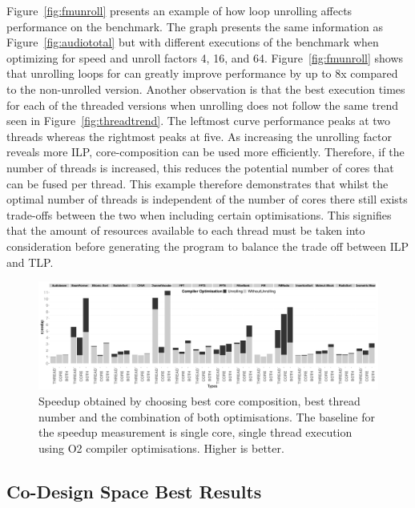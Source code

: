 Figure~\ref{fig:fmunroll} presents an example of how loop unrolling affects performance on the  benchmark.
The graph presents the same information as Figure~\ref{fig:audiototal} but with different executions of the benchmark when optimizing for speed and unroll factors 4, 16, and 64.
Figure~\ref{fig:fmunroll} shows that unrolling loops for  can greatly improve performance by up to 8x compared to the non-unrolled version.
Another observation is that the best execution times for each of the threaded versions when unrolling does not follow the same trend seen in Figure~\ref{fig:threadtrend}.
The leftmost curve performance peaks at two threads whereas the rightmost peaks at five.
As increasing the unrolling factor reveals more ILP, core-composition can be used more efficiently.
Therefore, if the number of threads is increased, this reduces the potential number of cores that can be fused per thread.
This example therefore demonstrates that whilst the optimal number of threads is independent of the number of cores there still exists trade-offs between the two when including certain optimisations.
This signifies that the amount of resources available to each thread must be taken into consideration before generating the program to balance the trade off between ILP and TLP.

\begin{landscape}
\begin{figure}\hspace{-1em}
    \includegraphics[width=1\linewidth,keepaspectratio]{streamit-paper/graphics/threadcompbench.pdf}
    \caption{Speedup obtained by choosing best core composition, best
      thread number and the combination of both optimisations. The baseline for the speedup measurement is single core, single thread execution using O2 compiler optimisations. Higher
      is better.}\label{fig:overviewhist}
\end{figure}
\end{landscape}

\subsection{Co-Design Space Best Results}

